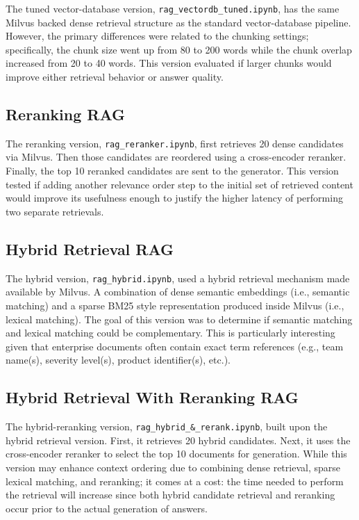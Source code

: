 The tuned vector-database version, \texttt{rag\_vectordb\_tuned.ipynb}, has the same Milvus backed dense retrieval structure as the standard vector-database pipeline. However, the primary differences were related to the chunking settings; specifically, the chunk size went up from 80 to 200 words while the chunk overlap increased from 20 to 40 words. This version evaluated if larger chunks would improve either retrieval behavior or answer quality.

\subsection{Reranking RAG}

The reranking version, \texttt{rag\_reranker.ipynb}, first retrieves 20 dense candidates via Milvus. Then those candidates are reordered using a cross-encoder reranker. Finally, the top 10 reranked candidates are sent to the generator. This version tested if adding another relevance order step to the initial set of retrieved content would improve its usefulness enough to justify the higher latency of performing two separate retrievals.

\subsection{Hybrid Retrieval RAG}

The hybrid version, \texttt{rag\_hybrid.ipynb}, used a hybrid retrieval mechanism made available by Milvus. A combination of dense semantic embeddings (i.e., semantic matching) and a sparse BM25 style representation produced inside Milvus (i.e., lexical matching). The goal of this version was to determine if semantic matching and lexical matching could be complementary. This is particularly interesting given that enterprise documents often contain exact term references (e.g., team name(s), severity level(s), product identifier(s), etc.).

\subsection{Hybrid Retrieval With Reranking RAG}

The hybrid-reranking version, \texttt{rag\_hybrid\_\&\_rerank.ipynb}, built upon the hybrid retrieval version. First, it retrieves 20 hybrid candidates. Next, it uses the cross-encoder reranker to select the top 10 documents for generation. While this version may enhance context ordering due to combining dense retrieval, sparse lexical matching, and reranking; it comes at a cost: the time needed to perform the retrieval will increase since both hybrid candidate retrieval and reranking occur prior to the actual generation of answers.

